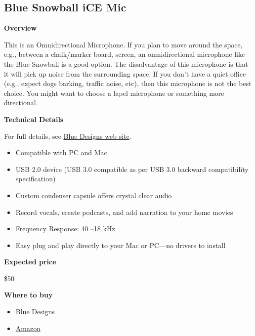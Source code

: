 \subsection{Blue Snowball iCE Mic}

\begin{gram}

\textbf{Overview}

This is an Omnidirectional Microphone. If you plan to move around the
space, e.g., between a chalk/marker board, screen, an omnidirectional
microphone like the Blue Snowball is a good option.
%
The disadvantage of this microphone is that it will pick up noise from the surrounding space.
%
If you don't have a quiet office (e.g., expect dogs barking, traffic noise, etc), then this microphone is not the best choice.  
%
You might want to choose a lapel microphone or something more directional.


\textbf{Technical Details}

For full details, see \href{https://www.bluedesigns.com/products/snowball-ice/}{Blue Designs web site}.

\begin{itemize}
\item
Compatible with PC and Mac.

\item  USB 2.0 device (USB 3.0 compatible as per USB 3.0 backward compatibility specification)

\item Custom condenser capsule offers crystal clear audio

\item Record vocals, create podcasts, and add narration to your home movies

\item Frequency Response: 40 –18 kHz

\item Easy plug and play directly to your Mac or PC—no drivers to install
\end{itemize}



\textbf{Expected price}

\$50


\textbf{Where to buy}


\begin{itemize}
\item 
\href{https://www.bluedesigns.com/products/snowball-ice/}{Blue Designs}

\item 
\href{https://www.amazon.com/Blue-Snowball-Condenser-Microphone-Cardioid/dp/B006DIA77E/ref=sxin_2_ac_d_rm?ac_md=1-1-c25vd2JhbGwgbWljcm9waG9uZQ%3D%3D-ac_d_rm&crid=35T8W1KNGCU61&cv_ct_cx=blue+yeti+usb+microphone&keywords=blue+yeti+usb+microphone&pd_rd_i=B006DIA77E&pd_rd_r=3aa58f9d-30b3-4a94-a0f9-899d4ec51554&pd_rd_w=TANss&pd_rd_wg=OOiJB&pf_rd_p=ec111f65-4a46-499c-be78-f47997212bd0&pf_rd_r=BKY12JJMDCSM54ABWTDX&psc=1&qid=1582900292&sprefix=Blue+ye,aps,168}{Amazon}
\end{itemize}

\end{gram}

